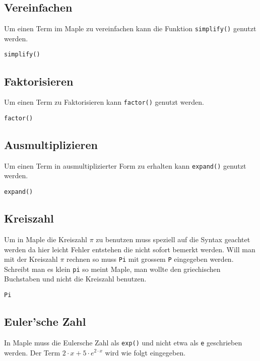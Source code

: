 \documentclass[a4paper,
               10pt,
               fleqn]{article}
\begin{document}
\subsection{Vereinfachen}
Um einen Term im Maple zu vereinfachen kann die Funktion \verb!simplify()!
genutzt werden.

\begin{lstlisting}[caption=Vereinfachen, label=Vereinfachen]
simplify()
\end{lstlisting}

\subsection{Faktorisieren}
Um einen Term zu Faktorisieren kann \verb!factor()! genutzt werden.

\begin{lstlisting}[caption=Faktorisieren, label=Faktorisieren]
factor()
\end{lstlisting}

\subsection{Ausmultiplizieren}
Um einen Term in ausmultiplizierter Form zu erhalten kann \verb!expand()!
genutzt werden.

\begin{lstlisting}[caption=Ausmultiplizieren, label=Ausmultiplizieren]
expand()
\end{lstlisting}

\subsection{Kreiszahl}
Um in Maple die Kreiszahl $\pi$ zu benutzen muss speziell auf die Syntax
geachtet werden da hier leicht Fehler entstehen die nicht sofort bemerkt 
werden. Will man mit der Kreiszahl $\pi$ rechnen so muss \verb!Pi! 
mit grossem \verb!P! eingegeben werden. Schreibt man es klein \verb!pi!
so meint Maple, man wollte den griechischen Buchstaben und nicht die 
Kreiszahl benutzen.

\begin{lstlisting}[caption=Pi, label=Pi]
Pi
\end{lstlisting}

\subsection{Euler'sche Zahl}
In Maple muss die Eulersche Zahl als \verb!exp()! und nicht etwa als 
\verb!e! geschrieben werden. Der Term $2 \cdot x + 5 \cdot e^{2 \cdot x}$
wird wie folgt eingegeben.
\end{document}
